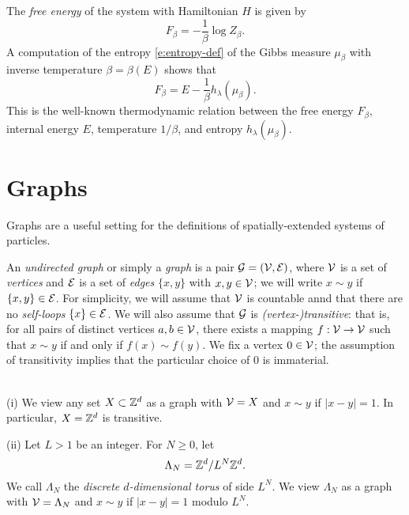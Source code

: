 The \emph{free energy} of the system with Hamiltonian $H$ is given by
\begin{equation}
F_\beta = -\frac{1}{\beta} \log Z_\beta.
\end{equation}
A computation of the entropy \eqref{e:entropy-def} of the Gibbs measure
$\mu_\beta$ with inverse temperature $\beta = \beta(E)$ shows that
\begin{equation}
F_\beta = E - \frac{1}{\beta} h_\lambda(\mu_\beta).
\end{equation}
This is the well-known thermodynamic relation between the free energy $F_\beta$,
internal energy $E$, temperature $1/\beta$, and entropy $h_\lambda(\mu_\beta)$.


\section{Graphs}

Graphs are a useful setting for the definitions of spatially-extended systems of
particles.

An \emph{undirected graph} or simply a \emph{graph} is a pair $\mathcal{G} = (\mathcal{V}, \mathcal{E})$,
where $\mathcal{V}$
is a set of \emph{vertices} and $\mathcal{E}$ is a set of
\emph{edges} $\{ x, y \}$ with $x, y \in \mathcal{V}$; we will write $x \sim y$ if
$\{ x, y \} \in \mathcal{E}$.
For simplicity, we will assume that $\mathcal{V}$ is countable annd that there are no
\emph{self-loops} $\{ x \} \in \mathcal{E}$.
We will also assume that $\mathcal{G}$ is \emph{(vertex-)transitive}: that is, for all pairs
of distinct
vertices $a, b \in \mathcal{V}$, there exists a mapping $f : \mathcal{V} \rightarrow \mathcal{V}$
such that $x \sim y$ if and only if $f(x) \sim f(y)$.
We fix a vertex $0\in\mathcal{V}$; the assumption of transitivity implies
that the particular choice of $0$ is immaterial.

\begin{example}\mbox{}\\
\smallskip\noindent
(i) We view any set $X \subset { {{\mathbb Z}}^d }$ as a graph with $\mathcal{V} = X$ and
$x\sim y$ if $|x - y| = 1$. In particular, $X = { {{\mathbb Z}}^d }$ is transitive.

\smallskip\noindent
(ii) Let $L > 1$ be an integer. For $N \ge 0$, let
\begin{equation}
\Lambda_N = { {{\mathbb Z}}^d }/L^N{ {{\mathbb Z}}^d }.
\end{equation}
We call $\Lambda_N$ the \emph{discrete $d$-dimensional torus} of side $L^N$.
We view $\Lambda_N$ as a graph with $\mathcal{V} = \Lambda_N$ and $x \sim y$
if $|x - y| = 1$ modulo $L^N$.
\end{example}

